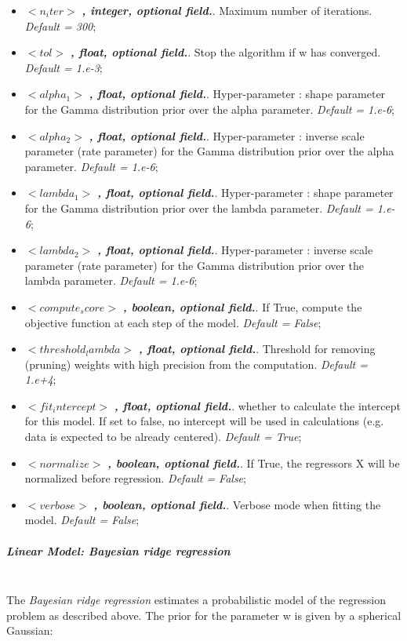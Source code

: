 \begin{itemize}
\item $<n_iter>$ \textbf{\textit{, integer, optional field.}}.  Maximum number of iterations. \textit{Default = 300};
\item $<tol>$ \textbf{\textit{, float, optional field.}}.  Stop the algorithm if w has converged. \textit{Default = 1.e-3};
\item $<alpha_1>$ \textbf{\textit{, float, optional field.}}.  Hyper-parameter : shape parameter for the Gamma distribution prior over the alpha parameter. \textit{Default =  1.e-6};
\item $<alpha_2>$ \textbf{\textit{, float, optional field.}}.  Hyper-parameter : inverse scale parameter (rate parameter) for the Gamma distribution prior over the alpha parameter. \textit{Default =  1.e-6};
\item $<lambda_1>$ \textbf{\textit{, float, optional field.}}.  Hyper-parameter : shape parameter for the Gamma distribution prior over the lambda parameter. \textit{Default =  1.e-6};
\item $<lambda_2>$ \textbf{\textit{, float, optional field.}}.  Hyper-parameter : inverse scale parameter (rate parameter) for the Gamma distribution prior over the lambda parameter. \textit{Default =  1.e-6};
\item $<compute_score>$ \textbf{\textit{, boolean, optional field.}}.  If True, compute the objective function at each step of the model. \textit{Default =  False};
\item $<threshold_lambda>$ \textbf{\textit{, float, optional field.}}.  Threshold for removing (pruning) weights with high precision from the computation. \textit{Default =  1.e+4};
\item $<fit_intercept>$ \textbf{\textit{, float, optional field.}}.  whether to calculate the intercept for this model. If set to false, no intercept will be used in calculations (e.g. data is expected to be already centered). \textit{Default =  True};
\item $<normalize>$ \textbf{\textit{, boolean, optional field.}}.  If True, the regressors X will be normalized before regression. \textit{Default =  False};
\item $<verbose>$ \textbf{\textit{, boolean, optional field.}}.  Verbose mode when fitting the model. \textit{Default =  False};
\end{itemize}
\subparagraph{Linear Model: Bayesian ridge regression}
\mbox{}
\\The \textit{Bayesian ridge regression}  estimates a probabilistic model of the regression problem as described above. The prior for the parameter w is given by a spherical Gaussian:
